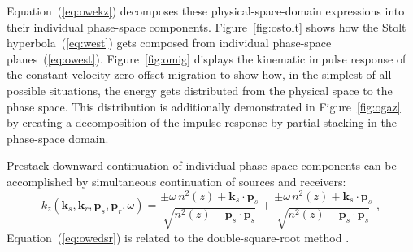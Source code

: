 Equation~(\ref{eq:owekz}) decomposes these physical-space-domain expressions
into their individual phase-space components. Figure~\ref{fig:ostolt} shows
how the Stolt hyperbola~(\ref{eq:west}) gets composed from individual
phase-space planes~(\ref{eq:owest}). Figure~\ref{fig:omig} displays the
kinematic impulse response of the constant-velocity zero-offset migration to
show how, in the simplest of all possible situations, the energy gets
distributed from the physical space to the phase space. This distribution is
additionally demonstrated in Figure~\ref{fig:ogaz} by creating a decomposition
of the impulse response by partial stacking in the phase-space domain.






Prestack downward continuation of individual phase-space components can be
accomplished by simultaneous continuation of sources and receivers:
\begin{equation}
  \label{eq:owedsr}
  k_z(\mathbf{k}_s,\mathbf{k}_r,\mathbf{p}_s,\mathbf{p}_r,\omega) = 
  \frac{\pm \omega\,n^2(z) + \mathbf{k}_s \cdot \mathbf{p}_s}
  {\sqrt{n^2(z)-\mathbf{p}_s \cdot \mathbf{p}_s}}
  + \frac{\pm \omega\,n^2(z) + \mathbf{k}_s \cdot \mathbf{p}_s}
  {\sqrt{n^2(z)-\mathbf{p}_s \cdot \mathbf{p}_s}}\;,
\end{equation}
Equation~(\ref{eq:owedsr}) is related to the double-square-root method
\cite[]{iei}.

